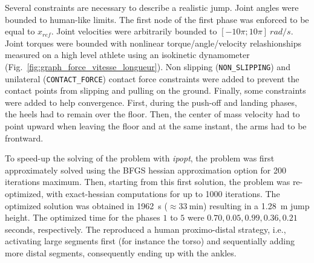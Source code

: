 Several constraints are necessary to describe a realistic jump.
Joint angles were bounded to human-like limits.
The first node of the first phase was enforced to be equal to $x_{ref}$. 
Joint velocities were arbitrarily bounded to $[-10 \pi; 10 \pi]~rad/s$.
Joint torques were bounded with nonlinear torque/angle/velocity relashionships measured on a high level athlete using an isokinetic dynamometer (Fig.~\ref{fig:graph_force_vitesse_longueur}). 
Non slipping (\texttt{NON\_SLIPPING}) and unilateral (\texttt{CONTACT\_FORCE}) contact force constraints were added to prevent the contact points from slipping and pulling on the ground.
Finally, some constraints were added to help convergence.
First, during the push-off and landing phases, the heels had to remain over the floor.
Then, the center of mass velocity had to point upward when leaving the floor and at the same instant, the arms had to be frontward. 

To speed-up the solving of the problem with \emph{ipopt}, the problem was first approximately solved using the BFGS hessian approximation option for 200 iterations maximum.
Then, starting from this first solution, the problem was re-optimized, with exact-hessian computations for up to 1000 iterations.
The optimized solution was obtained in \SI{1962}{\second} ($\approx\SI{33}{\minute}$) resulting in a \SI{1.28}{\meter} jump height.
The optimized time for the phases $1$ to $5$ were $0.70, 0.05, 0.99, 0.36, 0.21$ seconds, respectively.
The  reproduced a human proximo-distal strategy, i.e., activating large segments first (for instance the torso) and sequentially adding more distal segments, consequently ending up with the ankles.

